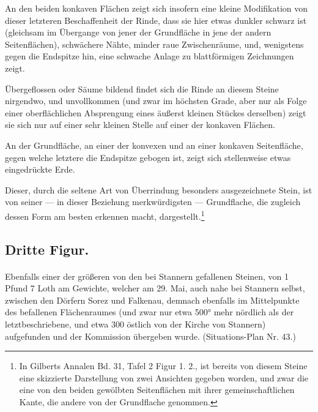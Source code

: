 \documentclass[a4paper, 11pt, oneside, german]{article}
\begin{document}
An den beiden konkaven Flächen zeigt sich insofern eine kleine Modifikation von dieser letzteren Beschaffenheit der Rinde, dass sie hier etwas dunkler schwarz ist (gleichsam im Übergange von jener der Grundfläche in jene der andern Seitenflächen), schwächere Nähte, minder raue Zwischenräume, und, wenigstens gegen die Endspitze hin, eine schwache Anlage zu blattförmigen Zeichnungen zeigt.

Übergeflossen oder Säume bildend findet sich die Rinde an diesem Steine nirgendwo, und unvollkommen (und zwar im höchsten Grade, aber nur als Folge einer oberflächlichen Absprengung eines äußerst kleinen Stückes derselben) zeigt sie sich nur auf einer sehr kleinen Stelle auf einer der konkaven Flächen.

An der Grundfläche, an einer der konvexen und an einer konkaven Seitenfläche, gegen welche letztere die Endspitze gebogen ist, zeigt sich stellenweise etwas eingedrückte Erde.

Dieser, durch die seltene Art von Überrindung besonders ausgezeichnete Stein, ist von seiner --- in dieser Beziehung merkwürdigsten --- Grundflache, die zugleich dessen Form am besten erkennen macht, dargestellt.\footnote{In Gilberts Annalen Bd. 31, Tafel 2 Figur 1. 2., ist bereits von diesem Steine eine skizzierte Darstellung von zwei Ansichten gegeben worden, und zwar die eine von den beiden gewölbten Seitenflächen mit ihrer gemeinschaftlichen Kante, die andere von der Grundflache genommen.}

\subsection{Dritte Figur.}
\paragraph{}
Ebenfalls einer der größeren von den bei Stannern gefallenen Steinen, von 1 Pfund 7 Loth am Gewichte, welcher am 29. Mai, auch nahe bei Stannern selbst, zwischen den Dörfern Sorez und Falkenau, demnach ebenfalls im Mittelpunkte des befallenen Flächenraumes (und zwar nur etwa 500° mehr nördlich als der letztbeschriebene, und etwa 300 östlich von der Kirche von Stannern) aufgefunden und der Kommission übergeben wurde. (Situations-Plan Nr. 43.)
\end{document}
